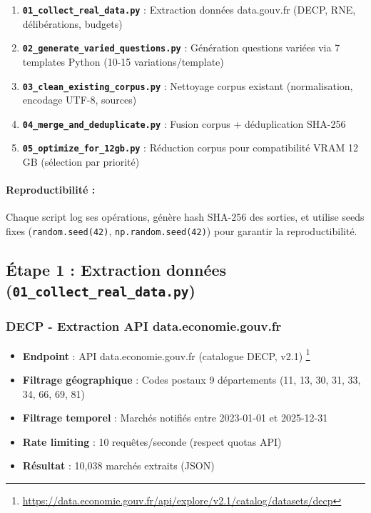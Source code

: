 \begin{enumerate}
    \item \textbf{\texttt{01\_collect\_real\_data.py}} : Extraction données data.gouv.fr (DECP, RNE, délibérations, budgets)
    
    \item \textbf{\texttt{02\_generate\_varied\_questions.py}} : Génération questions variées via 7 templates Python (10-15 variations/template)
    
    \item \textbf{\texttt{03\_clean\_existing\_corpus.py}} : Nettoyage corpus existant (normalisation, encodage UTF-8, sources)
    
    \item \textbf{\texttt{04\_merge\_and\_deduplicate.py}} : Fusion corpus + déduplication SHA-256
    
    \item \textbf{\texttt{05\_optimize\_for\_12gb.py}} : Réduction corpus pour compatibilité VRAM 12 GB (sélection par priorité)
\end{enumerate}

\paragraph{Reproductibilité :} Chaque script log ses opérations, génère hash SHA-256 des sorties, et utilise seeds fixes (\texttt{random.seed(42)}, \texttt{np.random.seed(42)}) pour garantir la reproductibilité.

\subsection{Étape 1 : Extraction données (\texttt{01\_collect\_real\_data.py})}

\subsubsection{DECP - Extraction API data.economie.gouv.fr}

\begin{itemize}
    \item \textbf{Endpoint} : API data.economie.gouv.fr (catalogue DECP, v2.1)
\footnote{\url{https://data.economie.gouv.fr/api/explore/v2.1/catalog/datasets/decp}}
    
    \item \textbf{Filtrage géographique} : Codes postaux 9 départements (11, 13, 30, 31, 33, 34, 66, 69, 81)
    
    \item \textbf{Filtrage temporel} : Marchés notifiés entre 2023-01-01 et 2025-12-31
    
    \item \textbf{Rate limiting} : 10 requêtes/seconde (respect quotas API)
    
    \item \textbf{Résultat} : 10,038 marchés extraits (JSON)
\end{itemize}

